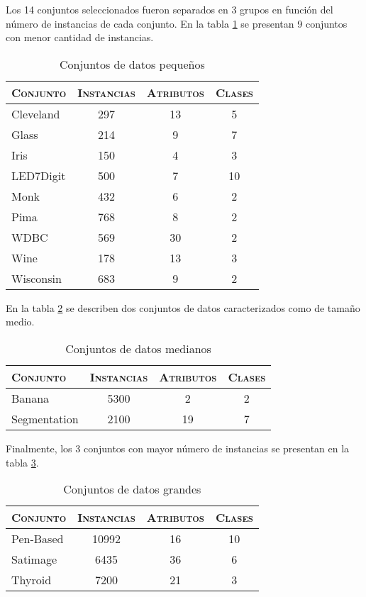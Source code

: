 Los 14 conjuntos seleccionados fueron separados en 3 grupos en función del número de instancias de cada conjunto. En la tabla \ref{data-small} se presentan 9 conjuntos con menor cantidad de instancias.

\begin{table}[h!]
\centering
\begin{tabular}{l c c c}
\hline
\textsc{Conjunto} & \textsc{Instancias} & \textsc{Atributos} & \textsc{Clases} \\
\hline
\hline
Cleveland & 297 & 13 &  5 \\
Glass     & 214 &  9 &  7 \\
Iris      & 150 &  4 &  3 \\
LED7Digit & 500 &  7 & 10 \\
Monk      & 432 &  6 &  2 \\
Pima      & 768 &  8 &  2 \\
WDBC      & 569 & 30 &  2 \\
Wine      & 178 & 13 &  3 \\
Wisconsin & 683 &  9 &  2 \\
\hline
\end{tabular}
\caption{Conjuntos de datos pequeños}
\label{data-small}
\end{table}

En la tabla \ref{data-med} se describen dos conjuntos de datos caracterizados como de tamaño medio.

\begin{table}[h!]
\centering
\begin{tabular}{l c c c}
\hline
\textsc{Conjunto} & \textsc{Instancias} & \textsc{Atributos} & \textsc{Clases} \\
\hline
\hline
Banana       &  5300 &  2 &  2 \\
Segmentation &  2100 & 19 &  7 \\
\hline
\end{tabular}
\caption{Conjuntos de datos medianos}
\label{data-med}
\end{table}

Finalmente, los 3 conjuntos con mayor número de instancias se presentan en la tabla \ref{data-big}.

\begin{table}[h!]
\centering
\begin{tabular}{l c c c}
\hline
\textsc{Conjunto} & \textsc{Instancias} & \textsc{Atributos} & \textsc{Clases} \\
\hline
\hline
Pen-Based    & 10992 & 16 & 10 \\
Satimage     &  6435 & 36 &  6 \\
Thyroid      &  7200 & 21 &  3 \\
\hline
\end{tabular}
\caption{Conjuntos de datos grandes}
\label{data-big}
\end{table}


